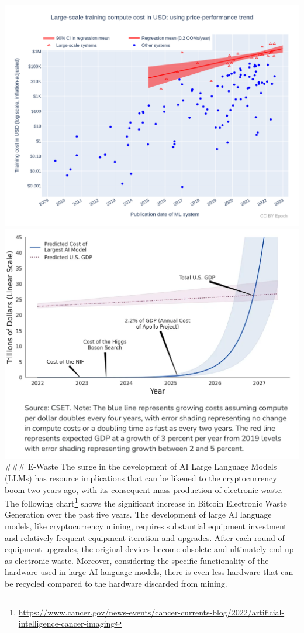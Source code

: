 \documentclass[
]{book}
\begin{document}
\includegraphics{figures/figure1.png}
\includegraphics{figures/figure2.png}
\#\#\# E-Waste
The surge in the development of AI Large Language Models (LLMs) has resource implications that can be likened to the cryptocurrency boom two years ago, with its consequent mass production of electronic waste. The following chart\footnote{\url{https://www.cancer.gov/news-events/cancer-currents-blog/2022/artificial-intelligence-cancer-imaging}} shows the significant increase in Bitcoin Electronic Waste Generation over the past five years. The development of large AI language models, like cryptocurrency mining, requires substantial equipment investment and relatively frequent equipment iteration and upgrades. After each round of equipment upgrades, the original devices become obsolete and ultimately end up as electronic waste. Moreover, considering the specific functionality of the hardware used in large AI language models, there is even less hardware that can be recycled compared to the hardware discarded from mining.
\end{document}
